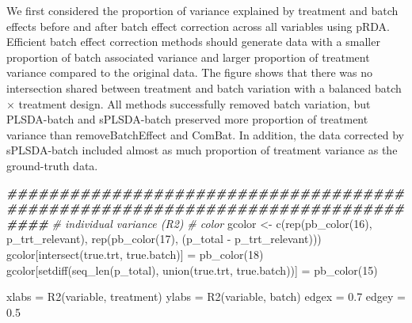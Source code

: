 \documentclass[
]{book}
\newenvironment{Shaded}{\begin{snugshade}}{\end{snugshade}}
\newcommand{\CommentTok}[1]{\textcolor[rgb]{0.56,0.35,0.01}{\textit{#1}}}
\newcommand{\DecValTok}[1]{\textcolor[rgb]{0.00,0.00,0.81}{#1}}
\newcommand{\DocumentationTok}[1]{\textcolor[rgb]{0.56,0.35,0.01}{\textbf{\textit{#1}}}}
\newcommand{\FloatTok}[1]{\textcolor[rgb]{0.00,0.00,0.81}{#1}}
\newcommand{\FunctionTok}[1]{\textcolor[rgb]{0.00,0.00,0.00}{#1}}
\newcommand{\NormalTok}[1]{#1}
\newcommand{\OtherTok}[1]{\textcolor[rgb]{0.56,0.35,0.01}{#1}}
\newcommand{\SpecialCharTok}[1]{\textcolor[rgb]{0.00,0.00,0.00}{#1}}
\newcommand{\StringTok}[1]{\textcolor[rgb]{0.31,0.60,0.02}{#1}}
\begin{document}
We first considered the proportion of variance explained by treatment and batch effects before and after batch effect correction across all variables using pRDA. Efficient batch effect correction methods should generate data with a smaller proportion of batch associated variance and larger proportion of treatment variance compared to the original data. The figure shows that there was no intersection shared between treatment and batch variation with a balanced batch \(\times\) treatment design. All methods successfully removed batch variation, but PLSDA-batch and sPLSDA-batch preserved more proportion of treatment variance than removeBatchEffect and ComBat. In addition, the data corrected by sPLSDA-batch included almost as much proportion of treatment variance as the ground-truth data.

\begin{Shaded}
\begin{Highlighting}[]
\DocumentationTok{\#\#\#\#\#\#\#\#\#\#\#\#\#\#\#\#\#\#\#\#\#\#\#\#\#\#\#\#\#\#\#\#\#\#\#\#\#\#\#\#\#\#\#\#\#\#\#\#\#\#\#\#\#\#\#\#\#\#\#\#\#\#\#\#\#\#\#\#\#\#\#\#\#\#\#\#\#\#\#\#}
\CommentTok{\# individual variance (R2)}
\CommentTok{\# color}
\NormalTok{gcolor }\OtherTok{\textless{}{-}} \FunctionTok{c}\NormalTok{(}\FunctionTok{rep}\NormalTok{(}\FunctionTok{pb\_color}\NormalTok{(}\DecValTok{16}\NormalTok{), p\_trt\_relevant), }
            \FunctionTok{rep}\NormalTok{(}\FunctionTok{pb\_color}\NormalTok{(}\DecValTok{17}\NormalTok{), (p\_total }\SpecialCharTok{{-}}\NormalTok{ p\_trt\_relevant)))}
\NormalTok{gcolor[}\FunctionTok{intersect}\NormalTok{(true.trt, true.batch)] }\OtherTok{=} \FunctionTok{pb\_color}\NormalTok{(}\DecValTok{18}\NormalTok{)}
\NormalTok{gcolor[}\FunctionTok{setdiff}\NormalTok{(}\FunctionTok{seq\_len}\NormalTok{(p\_total), }\FunctionTok{union}\NormalTok{(true.trt, true.batch))] }\OtherTok{=} \FunctionTok{pb\_color}\NormalTok{(}\DecValTok{15}\NormalTok{)}

\NormalTok{xlabs }\OtherTok{=} \StringTok{\textquotesingle{}R2(variable, treatment)\textquotesingle{}}
\NormalTok{ylabs }\OtherTok{=} \StringTok{\textquotesingle{}R2(variable, batch)\textquotesingle{}}
\NormalTok{edgex }\OtherTok{=} \FloatTok{0.7}
\NormalTok{edgey }\OtherTok{=} \FloatTok{0.5}


\end{Highlighting}
\end{Shaded}
\end{document}
